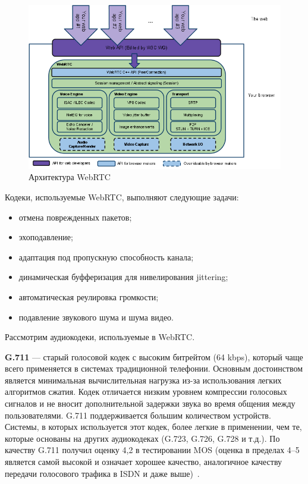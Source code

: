 \begin{figure}[h!]
  \centering
  \includegraphics[width=150mm]{pic/webrtc_architecture.png}
  \caption{Архитектура WebRTC}
  \label{pic:webrtc_architecture}
\end{figure}

Кодеки, используемые WebRTC, выполняют следующие задачи:
\begin{itemize}
\item отмена поврежденных пакетов;
\item эхоподавление;
\item адаптация под пропускную способность канала;
\item динамическая буфферизация для нивелирования jittering;
\item автоматическая реулировка громкости;
\item подавление звукового шума и шума видео.
\end{itemize}

Рассмотрим аудиокодеки, используемые в WebRTC.

\textbf{G.711} --- старый голосовой кодек с высоким битрейтом (64 kbps), 
который чаще всего применяется в системах традиционной телефонии. 
Основным достоинством является минимальная вычислительная нагрузка 
из-за использования легких алгоритмов сжатия.
Кодек отличается низким уровнем компрессии голосовых сигналов
и не вносит дополнительной задержки звука во время общения между пользователями.
G.711 поддерживается большим количеством устройств. 
Системы, в которых используется этот кодек, более легкие в применении, 
чем те, которые основаны на других аудиокодеках (G.723, G.726, G.728 и т.д.). 
По качеству G.711 получил оценку 4{,}2 в тестировании MOS 
(оценка в пределах 4--5 является самой высокой и означает хорошее качество, 
аналогичное качеству передачи голосового трафика в ISDN и даже выше)~\cite{webrtc_start}.

